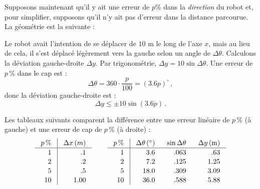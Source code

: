 Supposons maintenant qu'il y ait une erreur de $p\%$ dans la \emph{direction} du robot et, pour simplifier, supposons qu'il n'y ait pas d'erreur dans la distance parcourue. La géométrie est la suivante :

\begin{center}
\end{center}

Le robot avait l'intention de se déplacer de $10$ m le long de l'axe $x$, mais au lieu de cela, il s'est déplacé légèrement vers la gauche selon un angle de $\Delta \theta$. Calculons la déviation gauche-droite $\Delta y$. Par trigonométrie, $\Delta y = 10\sin \Delta\theta$. Une erreur de $p\,\%$ dans le cap est :
\[
\Delta\theta=360\cdot\frac{p}{100}=(3.6p)^\circ\,,
\]
donc la déviation gauche-droite est :
\[
\Delta y \leq \pm 10 \sin (3.6p)\,.
\]

Les tableaux suivants comparent la différence entre une erreur linéaire de $p\,\%$ (à gauche) et une erreur de cap de $p\,\%$ (à droite) :
\begin{displaymath}
\setlength{\arraycolsep}{2ex}
\renewcommand{\arraystretch}{1.1}
\begin{array}{r|r}
\multicolumn{1}{c|}{p\,\%} & \multicolumn{1}{c}{\Delta x \,(m)}\\\hline
1 & .1 \\
2 & .2 \\
5 & .5 \\
10 & 1.00\\
\end{array}
\;\;\;\;\;\;\;\;
\begin{array}{r|rrr}
\multicolumn{1}{c|}{p\,\%} & \multicolumn{1}{c}{\Delta \theta\,({}^\circ)} & \multicolumn{1}{c}{\sin\Delta\theta} & \multicolumn{1}{c}{\Delta y \,(\textrm{m})}\\\hline
1 & 3.6 & .063 & .63\\
2 & 7.2 & .125 & 1.25\\
5 & 18.0 & .309 & 3.09\\
10 & 36.0 & .588 & 5.88\\
\end{array}
\end{displaymath}

